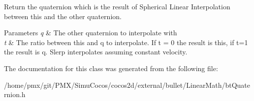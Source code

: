 Return the quaternion which is the result of Spherical Linear Interpolation between this and the other quaternion. 


\begin{DoxyParams}{Parameters}
{\em q} & The other quaternion to interpolate with \\
\hline
{\em t} & The ratio between this and q to interpolate. If t = 0 the result is this, if t=1 the result is q. Slerp interpolates assuming constant velocity. \\
\hline
\end{DoxyParams}


The documentation for this class was generated from the following file\+:\begin{DoxyCompactItemize}
\item 
/home/pmx/git/\+P\+M\+X/\+Simu\+Cocos/cocos2d/external/bullet/\+Linear\+Math/bt\+Quaternion.\+h\end{DoxyCompactItemize}
